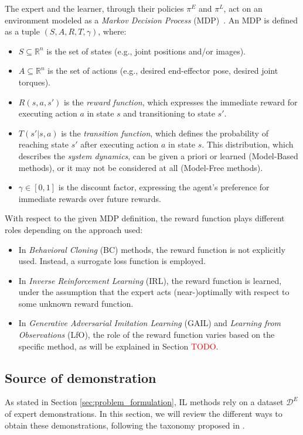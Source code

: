 The expert and the learner, through their policies $\pi^{E}$ and $\pi^{L}$, act on an environment modeled as a \textit{Markov Decision Process} (MDP)~\cite{kroemer2021review_robot_learning}. An MDP is defined as a tuple $(S, A, R, T, \gamma)$, where:
\begin{itemize}
    \item $S \subseteq \mathbb{R}^{n}$ is the set of states (e.g., joint positions and/or images).
    \item $A \subseteq \mathbb{R}^{n}$ is the set of actions (e.g., desired end-effector pose, desired joint torques).
    \item $R(s, a, s')$ is the \textit{reward function}, which expresses the immediate reward for executing action $a$ in state $s$ and transitioning to state $s'$.
    \item $T(s' | s, a)$ is the \textit{transition function}, which defines the probability of reaching state $s'$ after executing action $a$ in state $s$. This distribution, which describes the \textit{system dynamics}, can be given a priori or learned (Model-Based methods), or it may not be considered at all (Model-Free methods).
    \item $\gamma \in [0,1]$ is the discount factor, expressing the agent's preference for immediate rewards over future rewards.
\end{itemize}

With respect to the given MDP definition, the reward function plays different roles depending on the approach used:
\begin{itemize}
    \item In \textit{Behavioral Cloning} (BC) methods, the reward function is not explicitly used. Instead, a surrogate loss function is employed.
    \item In \textit{Inverse Reinforcement Learning} (IRL), the reward function is learned, under the assumption that the expert acts (near-)optimally with respect to some unknown reward function.
    \item In \textit{Generative Adversarial Imitation Learning} (GAIL) and \textit{Learning from Observations} (LfO), the role of the reward function varies based on the specific method, as will be explained in Section \textcolor{red}{TODO}.
\end{itemize}



\subsection{Source of demonstration}

As stated in Section \ref{sec:problem_formulation}, IL methods rely on a dataset $\mathcal{D}^{E}$ of expert demonstrations. In this section, we will review the different ways to obtain these demonstrations, following the taxonomy proposed in \cite{fang2019survey}.

